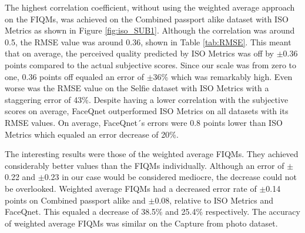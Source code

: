 \begin{table}[h]
\caption{The calculated RMSE values of the FIQMs on the datasets relative to the subjective scores. The RMSE value was not calculated for the Selfie dataset with a weighted average of the FIQMs. The `X' symbolises this.}
\label{tab:RMSE}
\end{table}
The highest correlation coefficient, without using the weighted average approach on the FIQMs, was achieved on the Combined passport alike dataset with ISO Metrics as shown in Figure \ref{fig:iso_SUB1}. Although the correlation was around 0.5, the RMSE value was around 0.36, shown in Table \ref{tab:RMSE}. This meant that on average, the perceived quality predicted by ISO Metrics was off by $\pm$0.36 points compared to the actual subjective scores. Since our scale was from zero to one, 0.36 points off equaled an error of $\pm$36\% which was remarkably high. Even worse was the RMSE value on the Selfie dataset with ISO Metrics with a staggering error of 43\%. Despite having a lower correlation with the subjective scores on average, FaceQnet outperformed ISO Metrics on all datasets with its RMSE values. On average, FaceQnet´s errors were 0.8 points lower than ISO Metrics which equaled an error decrease of 20\%.  

The interesting results were those of the weighted average FIQMs. They achieved considerably better values than the FIQMs individually. Although an error of $\pm$0.22 and $\pm$0.23 in our case would be considered mediocre, the decrease could not be overlooked. Weighted average FIQMs had a decreased error rate of $\pm$0.14 points on Combined passport alike and $\pm$0.08, relative to ISO Metrics and FaceQnet. This equaled a decrease of 38.5\% and 25.4\% respectively. The accuracy of weighted average FIQMs was similar on the Capture from photo dataset. 

